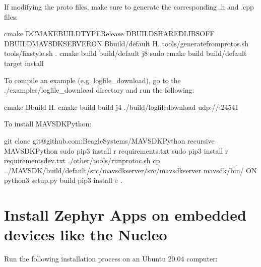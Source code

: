 \documentclass[letterpaper,10pt,english]{sphinxmanual}
\begin{document}
If modifying the proto files, make sure to generate the corresponding .h and .cpp files:

\begin{sphinxVerbatim}[commandchars=\\\{\}]
cmake \PYGZhy{}DCMAKE\PYGZus{}BUILD\PYGZus{}TYPERelease \PYGZhy{}DBUILD\PYGZus{}SHARED\PYGZus{}LIBSOFF \PYGZhy{}DBUILD\PYGZus{}MAVSDK\PYGZus{}SERVERON \PYGZhy{}Bbuild/default \PYGZhy{}H.  tools/generate\PYGZus{}from\PYGZus{}protos.sh  tools/fix\PYGZus{}style.sh .
cmake \PYGZhy{}\PYGZhy{}build build/default \PYGZhy{}j8  sudo cmake \PYGZhy{}\PYGZhy{}build build/default \PYGZhy{}\PYGZhy{}target install
\end{sphinxVerbatim}

To compile an example (e.g. logfile\_download), go to the ./examples/logfile\_download directory and run the following:

\begin{sphinxVerbatim}[commandchars=\\\{\}]
cmake \PYGZhy{}Bbuild \PYGZhy{}H.  cmake \PYGZhy{}\PYGZhy{}build build \PYGZhy{}j4  ./build/logfile\PYGZus{}download udp://:24541
\end{sphinxVerbatim}

To install MAVSDK\sphinxhyphen{}Python:

\begin{sphinxVerbatim}[commandchars=\\\{\}]
git clone git@github.com:BeagleSystems/MAVSDK\PYGZhy{}Python \PYGZhy{}\PYGZhy{}recursive
 MAVSDK\PYGZhy{}Python
sudo pip3 install \PYGZhy{}r requirements.txt
sudo pip3 install \PYGZhy{}r requirements\PYGZhy{}dev.txt
./other/tools/run\PYGZus{}protoc.sh
cp ../MAVSDK/build/default/src/mavsdk\PYGZus{}server/src/mavsdk\PYGZus{}server mavsdk/bin/
ON python3 setup.py build
pip3 install \PYGZhy{}e .
\end{sphinxVerbatim}


\section{Install Zephyr Apps on embedded devices like the Nucleo}
\label{\detokenize{source/howtos/install_zephyr_apps:install-zephyr-apps-on-embedded-devices-like-the-nucleo}}\label{\detokenize{source/howtos/install_zephyr_apps::doc}}
Run the following installation process on an Ubuntu 20.04 computer:
\end{document}
